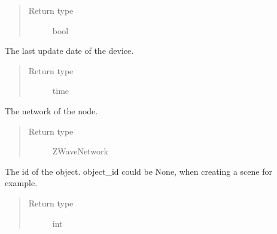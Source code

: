\documentclass[letterpaper,10pt,english]{sphinxmanual}
\begin{document}
\begin{fulllineitems}
\begin{fulllineitems}
\begin{quote}
\begin{description}
\item[{Return type}] \leavevmode
bool

\end{description}\end{quote}

\end{fulllineitems}


\begin{fulllineitems}
\label{object:openzwave.object.ZWaveObject.last_update}
The last update date of the device.
\begin{quote}\begin{description}
\item[{Return type}] \leavevmode
time

\end{description}\end{quote}

\end{fulllineitems}


\begin{fulllineitems}
\label{object:openzwave.object.ZWaveObject.network}
The network of the node.
\begin{quote}\begin{description}
\item[{Return type}] \leavevmode
ZWaveNetwork

\end{description}\end{quote}

\end{fulllineitems}


\begin{fulllineitems}
\label{object:openzwave.object.ZWaveObject.object_id}
The id of the object.
object\_id could be None, when creating a scene for example.
\begin{quote}\begin{description}
\item[{Return type}] \leavevmode
int

\end{description}\end{quote}


\end{fulllineitems}
\end{fulllineitems}
\end{document}
